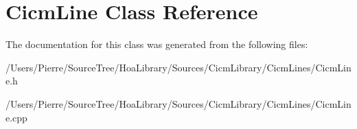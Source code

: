 \hypertarget{class_cicm_line}{\section{Cicm\-Line Class Reference}
\label{class_cicm_line}
}


The documentation for this class was generated from the following files\-:\begin{DoxyCompactItemize}
\item 
/\-Users/\-Pierre/\-Source\-Tree/\-Hoa\-Library/\-Sources/\-Cicm\-Library/\-Cicm\-Lines/Cicm\-Line.\-h\item 
/\-Users/\-Pierre/\-Source\-Tree/\-Hoa\-Library/\-Sources/\-Cicm\-Library/\-Cicm\-Lines/Cicm\-Line.\-cpp\end{DoxyCompactItemize}
